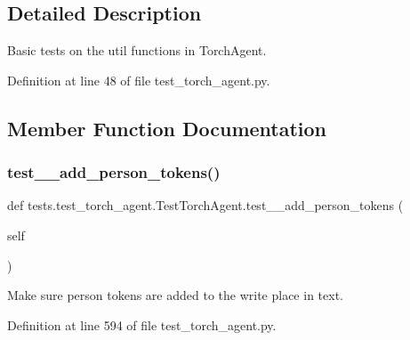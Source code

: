\subsection{Detailed Description}
\begin{DoxyVerb}Basic tests on the util functions in TorchAgent.
\end{DoxyVerb}
 

Definition at line 48 of file test\+\_\+torch\+\_\+agent.\+py.



\subsection{Member Function Documentation}
\mbox{\label{classtests_1_1test__torch__agent_1_1TestTorchAgent_a81c474c311d1825377b107d40d567d8a}} 
\subsubsection{\texorpdfstring{test\+\_\+\+\_\+add\+\_\+person\+\_\+tokens()}{test\_\_add\_person\_tokens()}}
{\footnotesize\ttfamily def tests.\+test\+\_\+torch\+\_\+agent.\+Test\+Torch\+Agent.\+test\+\_\+\+\_\+add\+\_\+person\+\_\+tokens (\begin{DoxyParamCaption}\item[{}]{self }\end{DoxyParamCaption})}

\begin{DoxyVerb}Make sure person tokens are added to the write place in text.
\end{DoxyVerb}
 

Definition at line 594 of file test\+\_\+torch\+\_\+agent.\+py.



